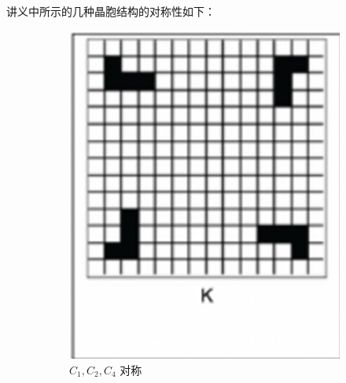 \documentclass{customDoc}
\begin{document}
讲义中所示的几种晶胞结构的对称性如下：

\begin{figure}[H]
    \begin{subfigure}[b]{0.2\textwidth}
        \includegraphics[width=\textwidth]{K.png}
        \caption{$C_1,C_2,C_4$ 对称}
        \label{fig:symmetry_A}
    \end{subfigure}
    \hfill
    \begin{subfigure}[b]{0.2\textwidth}

\end{subfigure}
\end{figure}
\end{document}

